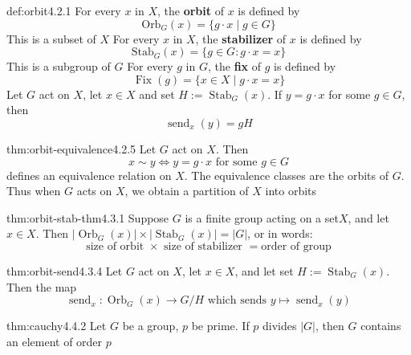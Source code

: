 \documentclass[landscape, 8pt]{extarticle}
\DeclareMathOperator{\Fix}{Fix}
\DeclareMathOperator{\Orb}{Orb}
\DeclareMathOperator{\Stab}{Stab}
\DeclareMathOperator{\send}{send}
\begin{document}
\begin{multicols}{3}
\begin{dfn}{def:orbit}{4.2.1}
    For every $x$ in $X$, the \textbf{orbit} of $x$ is defined by
    \[\text{Orb}_{G}(x)=\{g\cdot x \mid g\in G\}\]
    This is a subset of $X$
    \vspace{0pt}\newline
    For every $x$ in $X$, the \textbf{stabilizer} of $x$ is defined by
    \[\text{Stab}_{G}(x)=\{g\in G : g\cdot x = x\}\]
    This is a subgroup of $G$
    \vspace{0pt}\newline
    For every $g$ in $G$, the \textbf{fix} of $g$ is defined by
    \[\Fix (g) = \{x\in X\mid g\cdot x=x\}\]
    Let $G$ act on $X$, let $x\in X$ and set $H:=\Stab_{G}(x)$. If $y=g\cdot x$ for some $g\in G$, then
    \[\send_{x}(y)=gH\]
\end{dfn}
\vspace{-5pt}

\begin{thm}{thm:orbit-equivalence}{4.2.5}
Let $G$ act on $X$. Then
\[x\sim y \iff y = g\cdot x \text{ for some } g\in G\]
defines an equivalence relation on $X$. The equivalence classes are the orbits of $G$. Thus when $G$ acts on $X$, we obtain a partition of $X$ into orbits
\end{thm}
\vspace{-5pt}

\begin{thm}{thm:orbit-stab-thm}{4.3.1}
Suppose $G$ is a finite group acting on a set$X$, and let $x\in X$. Then $\lvert \Orb_{G}(x)\rvert \times \lvert \Stab_{G}(x)\rvert = \lvert G\rvert$, or in words:
\[\text{size of orbit } \times \text{ size of stabilizer } = \text{order of group}\]
\end{thm}
\vspace{-5pt}

\begin{thm}{thm:orbit-send}{4.3.4}
Let $G$ act on $X$, let $x \in X$, and let set $H:= \Stab_{G}(x)$. Then the map
$$\send_{x}: \Orb_{G}(x)\to G/H \text{ which sends } y\mapsto \send_{x}(y)$$
\end{thm}
\vspace{-5pt}

\begin{thm}{thm:cauchy}{4.4.2}
Let $G$ be a group, $p$ be prime. If $p$ divides $\lvert G\rvert $, then $G$ contains an element of order $p$
\end{thm}
\vspace{-5pt}
\newpage


\end{multicols}
\end{document}
